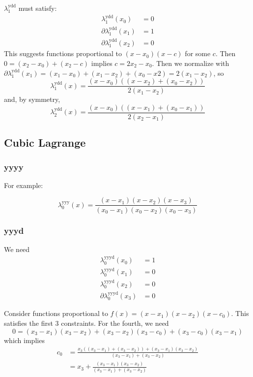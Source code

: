 $\lambda^{\text{ydd}}_1$ must satisfy:
\begin{align}
\lambda^{\text{ydd}}_1(x_0) & = 0 \\
\partial\lambda^{\text{ydd}}_1(x_1) & = 1 \nonumber \\
\partial\lambda^{\text{ydd}}_1(x_2) & = 0 \nonumber
\end{align}
This suggests functions proportional to $(x - x_0) (x - c)$ 
for some $c$. Then 
$ 0 = (x_2 - x_0) + (x_2 - c)$
implies $ c = 2 x_2 - x_0$.
Then we normalize with 
$\partial\lambda^{\text{ydd}}_1(x_1) = (x_1 - x_0) + (x_1 - x_2) + (x_0 - x2) 
= 2 (x_1 - x_2)$, so 
\begin{equation}
\lambda^{\text{ydd}}_1(x) = 
\frac {(x - x_0) \left((x - x_2) + (x_0 - x_2)\right)} 
{2 (x_1 - x_2)}
\end{equation}
and, by symmetry,
\begin{equation}
\lambda^{\text{ydd}}_2(x) = 
\frac {(x - x_0) \left( (x -x_1) + (x_0 - x_1) \right)} 
{2 (x_2 - x_1)}
\end{equation}

\subsection{Cubic Lagrange}
 
\subsubsection{yyyy}

For example:

\begin{equation}
\lambda^{\text{yyy}}_0(x) = 
\frac {(x - x_1) (x - x_2) (x - x_3)} 
{(x_0 - x_1) (x_0 - x_2) (x_0 - x_3)}
\end{equation}

\subsubsection{yyyd}

We need 
\begin{align}
\lambda^{\text{yyyd}}_0(x_0) & = 1 \\ 
\lambda^{\text{yyyd}}_0(x_1) & = 0 \nonumber \\
\lambda^{\text{yyyd}}_0(x_2) & = 0 \nonumber \\
\partial\lambda^{\text{yyyd}}_0(x_3) & = 0 \nonumber 
\end{align}

Consider functions proportional to $f(x) = (x-x_1)(x-x_2)(x-c_0)$.
This satisfies the first $3$ constraints.
For the fourth, we need
\begin{equation}
0 = (x_3-x_1)(x_3-x_2) + (x_3-x_2)(x_3-c_0) + (x_3-c_0)(x_3-x_1)
\end{equation}
which implies
\begin{align}
c_0 & = 
\frac
{x_3\left((x_3-x_1)+ (x_3-x_2)\right) + (x_3-x_1)(x_3-x_2)}
{(x_3-x_1)+ (x_3-x_2)} 
\\
 &= x_3 + 
\frac
{(x_3-x_1)(x_3-x_2)}
{(x_3-x_1)+ (x_3-x_2)} 
\nonumber
\end{align}

